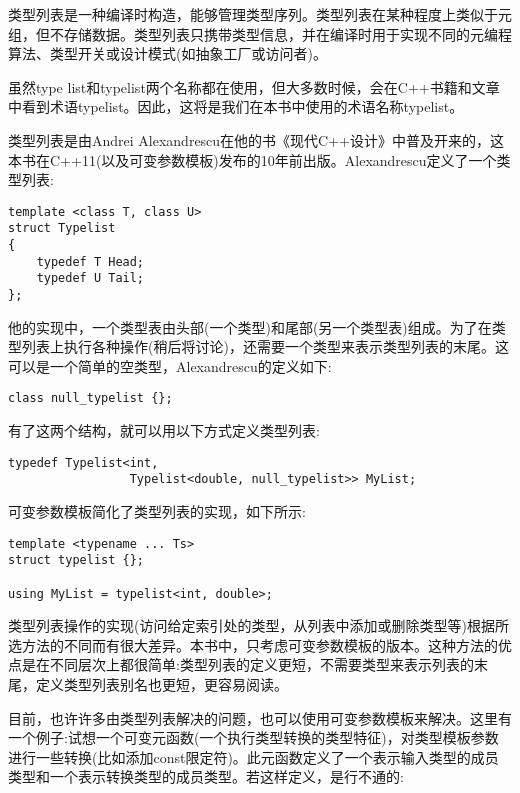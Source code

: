 
类型列表是一种编译时构造，能够管理类型序列。类型列表在某种程度上类似于元组，但不存储数据。类型列表只携带类型信息，并在编译时用于实现不同的元编程算法、类型开关或设计模式(如抽象工厂或访问者)。

\begin{tcolorbox}[breakable,enhanced jigsaw,colback=blue!5!white,colframe=blue!75!black,title={重要的Note}]
虽然type list和typelist两个名称都在使用，但大多数时候，会在C++书籍和文章中看到术语typelist。因此，这将是我们在本书中使用的术语名称typelist。
\end{tcolorbox}

类型列表是由Andrei Alexandrescu在他的书《现代C++设计》中普及开来的，这本书在C++11(以及可变参数模板)发布的10年前出版。Alexandrescu定义了一个类型列表:

\begin{lstlisting}[style=styleCXX]
template <class T, class U>
struct Typelist
{
	typedef T Head;
	typedef U Tail;
};
\end{lstlisting}

他的实现中，一个类型表由头部(一个类型)和尾部(另一个类型表)组成。为了在类型列表上执行各种操作(稍后将讨论)，还需要一个类型来表示类型列表的末尾。这可以是一个简单的空类型，Alexandrescu的定义如下:

\begin{lstlisting}[style=styleCXX]
class null_typelist {};
\end{lstlisting}

有了这两个结构，就可以用以下方式定义类型列表:

\begin{lstlisting}[style=styleCXX]
typedef Typelist<int,
				 Typelist<double, null_typelist>> MyList;
\end{lstlisting}

可变参数模板简化了类型列表的实现，如下所示:

\begin{lstlisting}[style=styleCXX]
template <typename ... Ts>
struct typelist {};

using MyList = typelist<int, double>;
\end{lstlisting}

类型列表操作的实现(访问给定索引处的类型，从列表中添加或删除类型等)根据所选方法的不同而有很大差异。本书中，只考虑可变参数模板的版本。这种方法的优点是在不同层次上都很简单:类型列表的定义更短，不需要类型来表示列表的末尾，定义类型列表别名也更短，更容易阅读。

目前，也许许多由类型列表解决的问题，也可以使用可变参数模板来解决。这里有一个例子:试想一个可变元函数(一个执行类型转换的类型特征)，对类型模板参数进行一些转换(比如添加const限定符)。此元函数定义了一个表示输入类型的成员类型和一个表示转换类型的成员类型。若这样定义，是行不通的:

